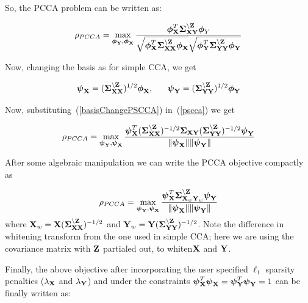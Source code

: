 \documentclass{llncs}
\newcommand{\X}{{\bf X}}
\newcommand{\Y}{{\bf Y}}
\newcommand{\Z}{{\bf Z}}
\newcommand{\bs}{\boldsymbol}
\begin{document}


So, the PCCA problem can be written as:

\begin{equation}
\label{pscca}
\rho_{PCCA}=\max_{{\bs\phi_{\Y}}, {\bs\phi_{\X}}} \frac{\bs\phi_{\X}^T \bs\Sigma_{\X\Y}^{\backslash \Z}\bs\phi_Y}{\sqrt{\bs\phi_{\X}^T\bs\Sigma_{\X\X}^{\backslash \Z}\bs\phi_{\X}}\sqrt{\bs\phi_{\Y}^T\bs\Sigma_{\Y\Y}^{\backslash \Z}\bs\phi_{\Y}}}
\end{equation}


Now, changing the basis as for simple CCA, we get

\begin{equation}
\label{basisChangePSCCA}
\bs\psi_{\X} = (\bs\Sigma_{\X\X}^{\backslash \Z})^{1/2}\bs\phi_{\X}, \;\;\;\;\;\;   \bs\psi_{\Y} = (\bs\Sigma_{\Y\Y}^{\backslash \Z})^{1/2}\bs\phi_{\Y} 
\end{equation}

Now, substituting~(\ref{basisChangePSCCA}) in~(\ref{pscca}) we get 

\begin{equation}
\label{subsPSCCA}
\rho_{PCCA}= \max_{{\bs\psi_{\Y}}, {\bs\psi_{\X}}} \frac{\bs\psi_{\X}^T (\bs\Sigma_{\X\X}^{\backslash \Z})^{-1/2}\bs\Sigma_{\X\Y}(\bs\Sigma_{\Y\Y}^{\backslash \Z})^{-1/2}\bs\psi_{\Y}}{\|\bs\psi_{\X}\| \|\bs\psi_{\Y}\|}
\end{equation}

After some algebraic manipulation we can write the PCCA objective compactly as

\begin{equation}
\label{psccacompact}
\rho_{PCCA}=\max_{{\bs\psi_{\Y}}, {\bs\psi_{\X}}} \frac{\bs\psi_{\X}^T \bs\Sigma_{\X_w\Y_w}^{\backslash \Z}\bs\psi_{\Y}}{\|\bs\psi_{\X}\| \|\bs\psi_{\Y}\|}
\end{equation}
where $\X_w=\X(\bs\Sigma_{\X\X}^{\backslash \Z})^{-1/2}$ and
$\Y_w=\Y(\bs\Sigma_{\Y\Y}^{\backslash \Z})^{-1/2}$. Note the
difference in whitening transform from the one used in simple CCA;
here we are using the covariance matrix with $\Z$ partialed out,
to whiten$\X$ and $\Y$.


Finally, the above objective after incorporating the user specified $\ell_1$ sparsity penalties ($\lambda_{\X}$ and $\lambda_{\Y}$) and under the constraints $\bs\psi_{\X}^T\bs\psi_{\X}=\bs\psi_{\Y}^T\bs\psi_{\Y}=1$ can be finally written as:
\end{document}
